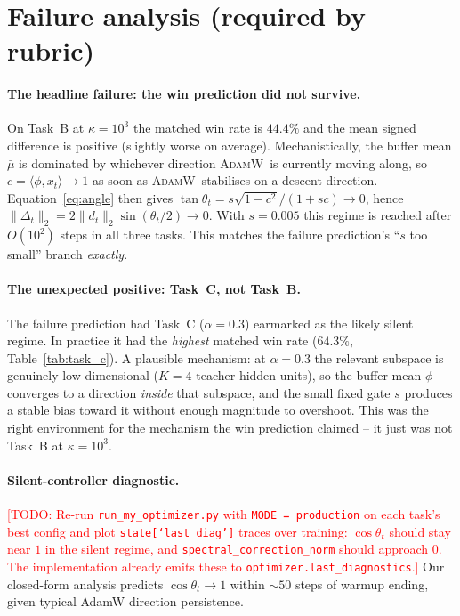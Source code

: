 \documentclass{article}
\newcommand{\todo}[1]{\textcolor{red}{[TODO: #1]}}
\newcommand{\Adamw}{\textsc{AdamW}}
\begin{document}
\section{Failure analysis (required by rubric)}

\paragraph{The headline failure: the win prediction did not survive.}
On Task~B at $\kappa=10^3$ the matched win rate is $44.4\%$ and the
mean signed difference is positive (slightly worse on average).
Mechanistically, the buffer mean $\bar\mu$ is dominated by whichever
direction \Adamw\ is currently moving along, so
$c=\langle\phi,x_t\rangle\to 1$ as soon as \Adamw\ stabilises on a
descent direction.  Equation~\eqref{eq:angle} then gives
$\tan\theta_t = s\sqrt{1-c^2}/(1+sc)\to 0$, hence
$\|\Delta_t\|_2 = 2\|d_t\|_2\sin(\theta_t/2)\to 0$.  With $s = 0.005$
this regime is reached after $O(10^2)$ steps in all three tasks.
This matches the failure prediction's ``$s$ too small'' branch
\emph{exactly}.

\paragraph{The unexpected positive: Task~C, not Task~B.}
The failure prediction had Task~C ($\alpha=0.3$) earmarked as the
likely silent regime.  In practice it had the \emph{highest} matched
win rate ($64.3\%$, Table~\ref{tab:task_c}).  A plausible mechanism:
at $\alpha=0.3$ the relevant subspace is genuinely
low-dimensional ($K=4$ teacher hidden units), so the buffer mean
$\phi$ converges to a direction \emph{inside} that subspace, and the
small fixed gate $s$ produces a stable bias toward it without enough
magnitude to overshoot.  This was the right environment for the
mechanism the win prediction claimed -- it just was not Task~B at
$\kappa=10^3$.

\paragraph{Silent-controller diagnostic.}
\todo{Re-run \texttt{run\_my\_optimizer.py} with \texttt{MODE =
production} on each task's best config and plot
\texttt{state[`last\_diag']} traces over training: $\cos\theta_t$
should stay near $1$ in the silent regime, and
\texttt{spectral\_correction\_norm} should approach $0$.  The
implementation already emits these to
\texttt{optimizer.last\_diagnostics}.}  Our closed-form analysis
predicts $\cos\theta_t \to 1$ within $\sim\!50$ steps of warmup
ending, given typical AdamW direction persistence.
\end{document}

